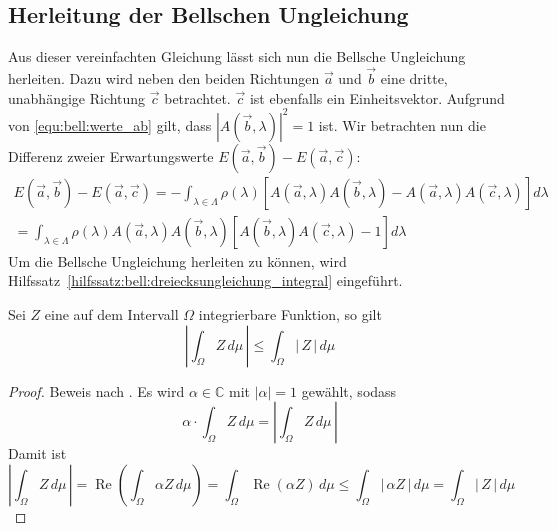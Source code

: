 \begin{refsection}
\subsection{Herleitung der Bellschen Ungleichung}
Aus dieser vereinfachten Gleichung l\"asst sich nun die Bellsche Ungleichung
herleiten.
Dazu wird neben den beiden Richtungen $\vec{a}$ und $\vec{b}$ eine dritte,
unabh\"angige Richtung $\vec{c}$ betrachtet. 
$\vec{c}$ ist ebenfalls ein Einheitsvektor.
Aufgrund von \eqref{equ:bell:werte_ab} gilt, dass
$|A(\vec{b},\lambda)|^2 = 1$ ist.
Wir betrachten nun die Differenz zweier Erwartungswerte
$E(\vec{a},\vec{b}) - E(\vec{a},\vec{c})$:
\begin{equation}\label{equ:bell:diff_e}
\begin{split}
    E(\vec{a},\vec{b}) - E(\vec{a},\vec{c}) =
    - \int_{\lambda\in\Lambda} \rho(\lambda) \left[ 
        A(\vec{a},\lambda) A(\vec{b},\lambda) - 
        A(\vec{a},\lambda) A(\vec{c},\lambda)
    \right] d\lambda \\
    = \int_{\lambda\in\Lambda} \rho(\lambda)A(\vec{a},\lambda)A(\vec{b},\lambda)
        \left[ A(\vec{b},\lambda)A(\vec{c},\lambda) - 1 \right] d\lambda
\end{split}
\end{equation}
Um die Bellsche Ungleichung herleiten zu k\"onnen, wird 
Hilfssatz~\ref{hilfssatz:bell:dreiecksungleichung_integral}
eingef\"uhrt.
\begin{hilfssatz}\label{hilfssatz:bell:dreiecksungleichung_integral}
    Sei $Z$ eine auf dem Intervall $\Omega$ integrierbare Funktion, so gilt
    \[
        \left|\int_{\Omega} Z\, d\mu\,\right| 
        \leq \int_{\Omega} |\,Z\,|\, d\mu
    \]
\end{hilfssatz}
\begin{proof}
    Beweis nach \cite{Bell:HilfssatzTriangle}.
    Es wird $\alpha\in\mathbb{C}$ mit $|\alpha| = 1$ gew\"ahlt, sodass
    \[
        \alpha \cdot \int_{\Omega} Z\, d\mu = 
        \left|\int_{\Omega} Z\, d\mu\,\right|
    \]
    Damit ist
    \[
        \left|\int_{\Omega} Z\, d\mu\,\right| = 
        \operatorname{Re}\left( \int_{\Omega}\alpha Z \,d\mu \right) = 
        \int_{\Omega}\operatorname{Re}(\alpha Z)\,d\mu
        \leq
        \int_{\Omega} |\,\alpha Z\,|\, d\mu = 
        \int_{\Omega} |\,Z\,|\, d\mu
    \]
\end{proof}


\end{refsection}
